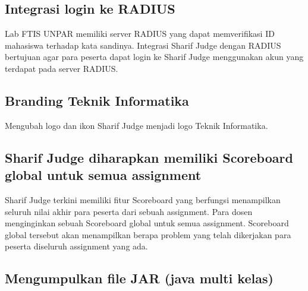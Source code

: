 \subsection{Integrasi login ke RADIUS}
Lab FTIS UNPAR memiliki server RADIUS yang dapat memverifikasi ID mahasiswa terhadap kata sandinya. Integrasi Sharif Judge dengan RADIUS bertujuan agar para peserta dapat login ke Sharif Judge menggunakan akun yang terdapat pada server RADIUS.

\subsection{Branding Teknik Informatika}
Mengubah logo dan ikon Sharif Judge menjadi logo Teknik Informatika.

\subsection{Sharif Judge diharapkan memiliki Scoreboard global untuk semua assignment}
Sharif Judge terkini memiliki fitur Scoreboard yang berfungsi menampilkan seluruh nilai akhir para peserta dari sebuah assignment. Para dosen menginginkan sebuah Scoreboard global untuk semua assignment. Scoreboard global tersebut akan menampilkan berapa problem yang telah dikerjakan para peserta diseluruh assignment yang ada.

\subsection{Mengumpulkan file JAR (java multi kelas)}
